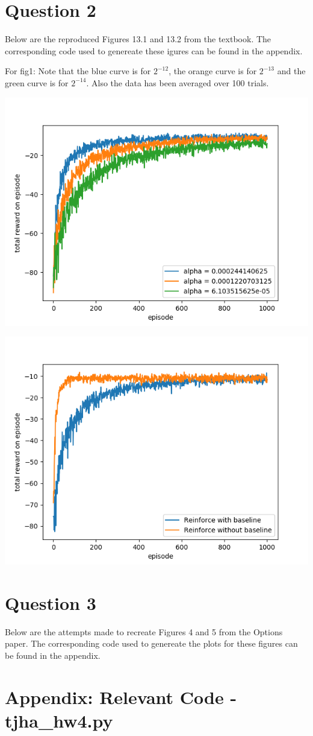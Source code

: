 \documentclass[11pt]{article}
\begin{document}
\section*{Question 2}
Below are the reproduced Figures 13.1 and 13.2 from the textbook. The corresponding code used to genereate these igures can be found in the appendix. 

For fig1: Note that the blue curve is for $2^{-12}$, the orange curve is for $2^{-13}$ and the green curve is for $2^{-14}$. Also the data has been averaged over 100 trials.

\includegraphics[scale=0.8]{fig1.png}

\includegraphics[scale=0.8]{fig2.png}

\section*{Question 3}
Below are the attempts made to recreate Figures 4 and 5 from the Options paper. The corresponding code used to genereate the plots for these figures can be found in the appendix.

\section*{Appendix: Relevant Code - tjha\_hw4.py}
   
\end{document}
